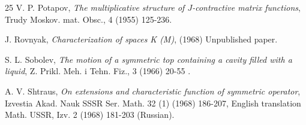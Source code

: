 \documentclass [12pt,reqno]{amsart}
\numberwithin{equation}{subsection}
\numberwithin{equation}{section}
\begin{document}
\begin{thebibliography}{25}
V. P. Potapov, \emph{The multiplicative structure of $J$-contractive matrix functions}, Trudy Moskov. mat. Obsc., 4 (1955) 125-236.

J. Rovnyak, \emph{ Characterization of spaces K (M)}, (1968) Unpublished paper.

S. L. Sobolev, \emph{The motion of a symmetric top containing a cavity filled with a liquid}, Z. Prikl. Meh. i Tehn. Fiz., 3 (1966) 20-55 .

A. V. Shtraus, \emph{On extensions and characteristic function of symmetric operator}, Izvestia Akad. Nauk SSSR Ser. Math. 
32 (1) (1968) 186-207, English translation Math. USSR, Izv. 2 (1968) 181-203 (Russian).

\end{thebibliography}
\end{document}
